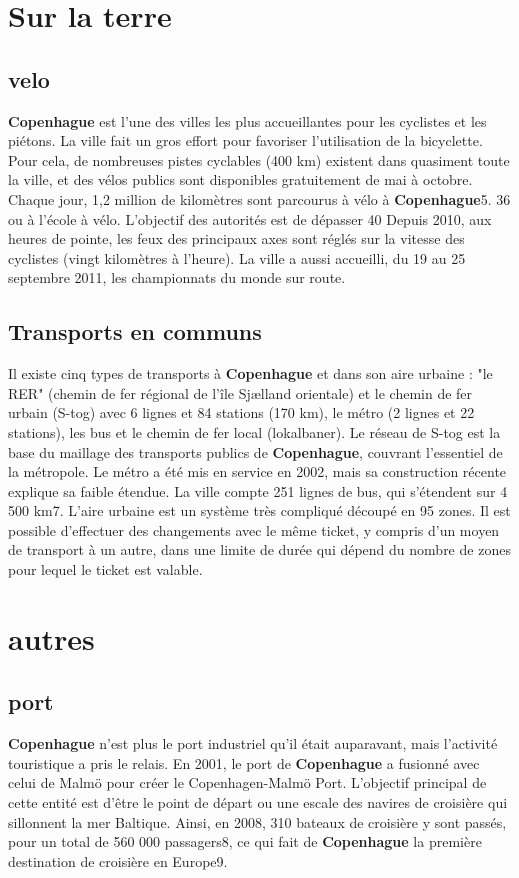 \documentclass[a4paper,10pt,openany]{memoir}
\begin{document}
\section{Sur la terre}

\subsection{velo}
\textbf{Copenhague} est l'une des villes les plus accueillantes pour les cyclistes et les piétons.
La ville fait un gros effort pour favoriser l'utilisation de la bicyclette. Pour cela, de 
nombreuses pistes cyclables (400 km) existent dans quasiment toute la ville, et des vélos 
publics sont disponibles gratuitement de mai à octobre. Chaque jour, 1,2 million de kilomètres 
sont parcourus à vélo à \textbf{Copenhague}5. 36 %
ou à l'école à vélo. L'objectif des autorités est de dépasser 40 %
Depuis 2010, aux heures de pointe, les feux des principaux axes sont réglés sur la vitesse des 
cyclistes (vingt kilomètres à l'heure).
La ville a aussi accueilli, du 19 au 25 septembre 2011, les championnats du monde sur route.
\subsection{Transports en communs}
Il existe cinq types de transports à \textbf{Copenhague} et dans son aire urbaine : 
"le RER" (chemin de fer régional de l'île Sjælland orientale) et le chemin de fer urbain (S-tog) 
avec 6 lignes et 84 stations (170 km), le métro (2 lignes et 22 stations), les bus et le chemin de 
fer local (lokalbaner). Le réseau de S-tog est la base du maillage des transports publics de
\textbf{Copenhague}, couvrant l'essentiel de la métropole. Le métro a été mis en service en 2002, 
mais sa construction récente explique sa faible étendue. La ville compte 251 lignes de bus, qui s'étendent 
sur 4 500 km7. L'aire urbaine est un système très compliqué découpé en 95 zones. Il est possible d'effectuer 
des changements avec le même ticket, y compris d'un moyen de transport à un autre, dans une limite de durée 
qui dépend du nombre de zones pour lequel le ticket est valable.

\section{autres}
\subsection{port}
\textbf{Copenhague} n'est plus le port industriel qu'il était auparavant, mais l'activité touristique a 
pris le relais. En 2001, le port de \textbf{Copenhague} a fusionné avec celui de Malmö pour créer le 
Copenhagen-Malmö Port. L'objectif principal de cette entité est d'être le point de départ ou une escale 
des navires de croisière qui sillonnent la mer Baltique. Ainsi, en 2008, 310 bateaux de croisière y sont 
passés, pour un total de 560 000 passagers8, ce qui fait de \textbf{Copenhague} la première destination de
croisière en Europe9.
\end{document}
